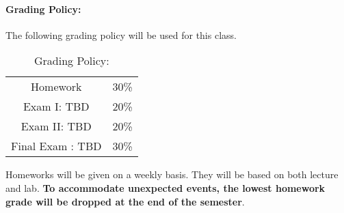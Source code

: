 \documentclass[11pt]{article}
\begin{document}
\paragraph{Grading Policy:} 
The following grading policy will be used for this class. 

\begin{table}[h!]
\caption{Grading Policy:}
\begin{center}
\begin{tabular}{cc}
Homework &30\%\\
Exam I:  TBD &20\%\\
Exam  II: TBD & 20\%\\
Final Exam :  TBD & 30\%\\
\end{tabular}
\end{center}
\label{default}
\end{table}%




%




Homeworks will be given on a weekly basis. They will be based on both lecture and lab. \textbf{To accommodate unexpected events, the lowest homework grade will be dropped at the end of the semester}.\\
\end{document}
